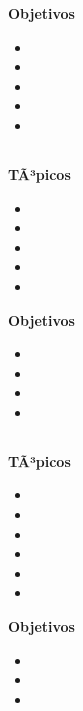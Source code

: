 \textbf{Objetivos}
\begin{itemize}
	\item \ALSIETEObjUNO
	\item \ALSIETEObjDOS
	\item \ALSIETEObjTRES
	\item \ALSIETEObjCUATRO
	\item \ALSIETEObjCINCO
\end{itemize}

\subsection{\ALOCHODef }\label{sec:BOK-AL8}

\textbf{TÃ³picos}
\begin{itemize}
	\item \ALOCHOTopicAnalisis
	\item \ALOCHOTopicAlgoritmos
	\item \ALOCHOTopicAlgoritmosaleatorios
	\item \ALOCHOTopicProgramacion
	\item \ALOCHOTopicOptimizacion
\end{itemize}

\textbf{Objetivos}
\begin{itemize}
	\item \ALOCHOObjUNO
	\item \ALOCHOObjDOS
	\item \ALOCHOObjTRES
	\item \ALOCHOObjCUATRO
\end{itemize}

\subsection{\ALNUEVEDef }\label{sec:BOK-AL9}

\textbf{TÃ³picos}
\begin{itemize}
	\item \ALNUEVETopicRevision
	\item \ALNUEVETopicCriptografia
	\item \ALNUEVETopicCriptografiade
	\item \ALNUEVETopicFirmas
	\item \ALNUEVETopicProtocolos
	\item \ALNUEVETopicAplicaciones
\end{itemize}

\textbf{Objetivos}
\begin{itemize}
	\item \ALNUEVEObjUNO
	\item \ALNUEVEObjDOS
	\item \ALNUEVEObjTRES
\end{itemize}

